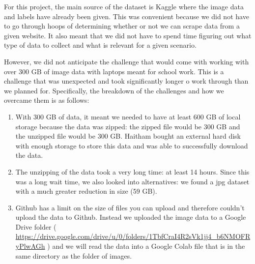 \documentclass[11pt]{article}
\begin{document}
For this project, the main source of the dataset is Kaggle where
the image data and labels have already been given. 
This was convenient because we did not have to go through hoops 
of determining whether or not we can scrape data from a given 
website. It also meant that we did not have to spend time figuring 
out what type of data to collect and what is relevant for a given 
scenario. 

However, we did not anticipate the challenge that would come with working 
with over 300 GB of image data with laptops meant for school work. 
This is a challenge that was unexpected and took significantly longer 
o work through than we planned for. Specifically, the breakdown of 
the challenges and how we overcame them is as follows:

\begin{enumerate}
  \item With 300 GB of data, it meant we needed to have at least 
  600 GB of local storage because the data was zipped: the zipped 
  file would be 300 GB and the unzipped file would be 300 GB. 
  Haitham bought an external hard disk with enough storage to store 
  this data and was able to successfully download the data.
  \item The unzipping of the data took a very long time: 
  at least 14 hours. Since this was a long wait time, we also 
  looked into alternatives: we found a jpg dataset with a much
  greater reduction in size (59 GB).
  \item Github has a limit on the size of files you can upload and 
  therefore couldn't upload the data to Github. Instead we uploaded
  the image data to a Google Drive folder (
    \url{https://drive.google.com/drive/u/0/folders/1TbfCraI4R2sVk1jj4_b6NMOFRyPlwAGh}
  ) and we will read the data 
  into a Google Colab file that is in the same directory as the folder 
  of images.
\end{enumerate}

\printbibliography
\end{document}
